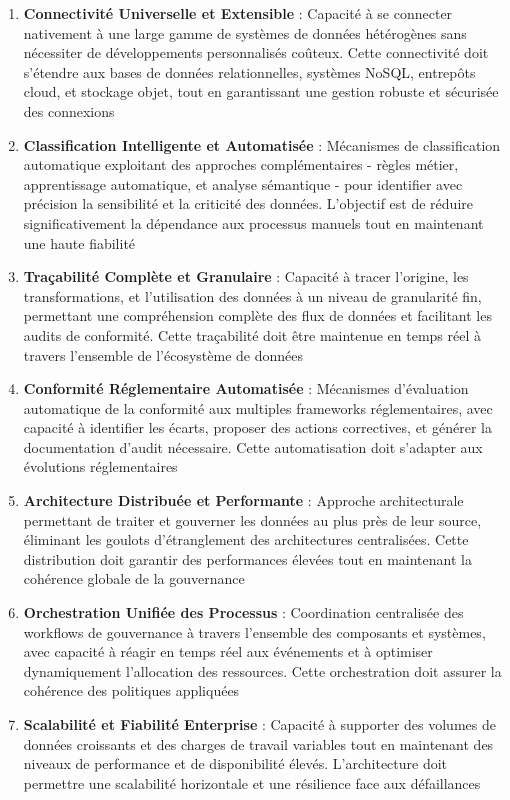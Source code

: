 \begin{enumerate}
    \item \textbf{Connectivité Universelle et Extensible} : Capacité à se connecter nativement à une large gamme de systèmes de données hétérogènes sans nécessiter de développements personnalisés coûteux. Cette connectivité doit s'étendre aux bases de données relationnelles, systèmes NoSQL, entrepôts cloud, et stockage objet, tout en garantissant une gestion robuste et sécurisée des connexions
    
    \item \textbf{Classification Intelligente et Automatisée} : Mécanismes de classification automatique exploitant des approches complémentaires - règles métier, apprentissage automatique, et analyse sémantique - pour identifier avec précision la sensibilité et la criticité des données. L'objectif est de réduire significativement la dépendance aux processus manuels tout en maintenant une haute fiabilité
    
    \item \textbf{Traçabilité Complète et Granulaire} : Capacité à tracer l'origine, les transformations, et l'utilisation des données à un niveau de granularité fin, permettant une compréhension complète des flux de données et facilitant les audits de conformité. Cette traçabilité doit être maintenue en temps réel à travers l'ensemble de l'écosystème de données
    
    \item \textbf{Conformité Réglementaire Automatisée} : Mécanismes d'évaluation automatique de la conformité aux multiples frameworks réglementaires, avec capacité à identifier les écarts, proposer des actions correctives, et générer la documentation d'audit nécessaire. Cette automatisation doit s'adapter aux évolutions réglementaires
    
    \item \textbf{Architecture Distribuée et Performante} : Approche architecturale permettant de traiter et gouverner les données au plus près de leur source, éliminant les goulots d'étranglement des architectures centralisées. Cette distribution doit garantir des performances élevées tout en maintenant la cohérence globale de la gouvernance
    
    \item \textbf{Orchestration Unifiée des Processus} : Coordination centralisée des workflows de gouvernance à travers l'ensemble des composants et systèmes, avec capacité à réagir en temps réel aux événements et à optimiser dynamiquement l'allocation des ressources. Cette orchestration doit assurer la cohérence des politiques appliquées
    
    \item \textbf{Scalabilité et Fiabilité Enterprise} : Capacité à supporter des volumes de données croissants et des charges de travail variables tout en maintenant des niveaux de performance et de disponibilité élevés. L'architecture doit permettre une scalabilité horizontale et une résilience face aux défaillances
\end{enumerate}

